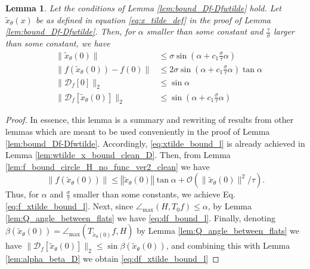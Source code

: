 \documentclass[12pt]{article}
\newtheorem{Lemma}[Theorem]{Lemma}
\theoremstyle{remark}
\newcommand{\DD}{\mathcal{D}}
\newcommand{\OO}{\mathcal{O}}
\newcommand{\norm}[1]{\left\Vert #1 \right\Vert}
\newcommand{\wtilde}[1]{\widetilde{#1}}
\newcommand{\maxangle}{\angle_{\max}}
\begin{document}
\begin{appendices}
\begin{Lemma}\label{lem:bounding_stuff}
Let the conditions of Lemma \ref{lem:bound_Df-Dfwtilde} hold. Let $\wtilde x_\theta(x)$ be as defined in equation \eqref{eq:x_tilde_def} in the proof of Lemma \ref{lem:bound_Df-Dfwtilde}.
Then, for $\alpha$ smaller than some constant and $\frac{\tau}{\sigma}$ larger than some constant, we have
\begin{align} \label{eq:xtilde_bound_l}
& \|\wtilde{x}_\theta(0)\| &\leq \sigma \sin (\alpha + c_1{\frac{\sigma}{\tau}}\alpha)
\\
\label{eq:f_xtilde_bound_l}
&\|f(\wtilde{x}_\theta(0)) - f(0)\| &\leq 2\sigma \sin (\alpha + c_1{\frac{\sigma}{\tau}}\alpha) \tan \alpha 
\\ \label{eq:df_bound_l}
&\|\DD_f[0]\|_2 &\leq \sin \alpha    
\\ \label{eq:df_xtilde_bound_l}
&\|\DD_f[\wtilde{x}_\theta(0)]\|_2 &\leq \sin (\alpha + c_1{\frac{\sigma}{\tau}}\alpha)
\end{align}

\end{Lemma}
\begin{proof}
In essence, this lemma is a summary and rewriting of results from other lemmas which are meant to be used conveniently in the proof of Lemma \ref{lem:bound_Df-Dfwtilde}. 
Accordingly, \eqref{eq:xtilde_bound_l} is already achieved in Lemma \ref{lem:wtilde_x_bound_clean_D}.
Then, from Lemma \ref{lem:f_bound_circle_H_no_func_ver2_clean} we have
\[
    \|f(\wtilde{x}_\theta(0))\| \leq \norm{\wtilde{x}_\theta(0)}\tan \alpha  +\OO(\|\wtilde{x}_\theta(0)\|^2/\tau)
.\]
Thus, for $\alpha$ and $\frac{\sigma}{\tau}$ smaller than some constants, we achieve Eq. \eqref{eq:f_xtilde_bound_l}.
Next, since $\maxangle(H, T_0f) \leq \alpha$, by Lemma \ref{lem:Q_angle_between_flats} we have \eqref{eq:df_bound_l}.
Finally, denoting $ \beta(\wtilde x_\theta(0)) =  \maxangle(T_{\wtilde x_\theta(0)}f, H)$ by Lemma \ref{lem:Q_angle_between_flats} we have $\|\DD_f[\wtilde{x}_\theta(0)]\|_2 \leq \sin \beta(\wtilde{x}_\theta(0))$, and combining this with Lemma \ref{lem:alpha_beta_D} we obtain \eqref{eq:df_xtilde_bound_l}

\end{proof}


\end{appendices}
\end{document}
